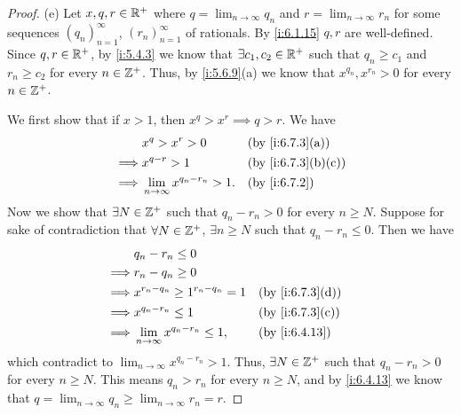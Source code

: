 \begin{proof}{(e)}
  Let \(x, q, r \in \mathbb{R}^+\) where \(q = \lim_{n \to \infty} q_n\) and \(r = \lim_{n \to \infty} r_n\) for some sequences \((q_n)_{n = 1}^\infty\), \((r_n)_{n = 1}^\infty\) of rationals.
  By \cref{i:6.1.15} \(q, r\) are well-defined.
  Since \(q, r \in \mathbb{R}^+\), by \cref{i:5.4.3} we know that \(\exists c_1, c_2 \in \mathbb{R}^+\) such that \(q_n \geq c_1\) and \(r_n \geq c_2\) for every \(n \in \mathbb{Z}^+\).
  Thus, by \cref{i:5.6.9}(a) we know that \(x^{q_n}, x^{r_n} > 0\) for every \(n \in \mathbb{Z}^+\).

  We first show that if \(x > 1\), then \(x^q > x^r \implies q > r\).
  We have
  \begin{align*}
             & x^q > x^r > 0                          &  & \by{i:6.7.3}[a]   \\
    \implies & x^{q - r} > 1                          &  & \by{i:6.7.3}[b,c] \\
    \implies & \lim_{n \to \infty} x^{q_n - r_n} > 1. &  & \by{i:6.7.2}      \\
  \end{align*}
  Now we show that \(\exists N \in \mathbb{Z}^+\) such that \(q_n - r_n > 0\) for every \(n \geq N\).
  Suppose for sake of contradiction that \(\forall N \in \mathbb{Z}^+\), \(\exists n \geq N\) such that \(q_n - r_n \leq 0\).
  Then we have
  \begin{align*}
             & q_n - r_n \leq 0                                               \\
    \implies & r_n - q_n \geq 0                                               \\
    \implies & x^{r_n - q_n} \geq 1^{r_n - q_n} = 1      &  & \by{i:6.7.3}[d] \\
    \implies & x^{q_n - r_n} \leq 1                      &  & \by{i:6.7.3}[c] \\
    \implies & \lim_{n \to \infty} x^{q_n - r_n} \leq 1, &  & \by{i:6.4.13}
  \end{align*}
  which contradict to \(\lim_{n \to \infty} x^{q_n - r_n} > 1\).
  Thus, \(\exists N \in \mathbb{Z}^+\) such that \(q_n - r_n > 0\) for every \(n \geq N\).
  This means \(q_n > r_n\) for every \(n \geq N\), and by \cref{i:6.4.13} we know that \(q = \lim_{n \to \infty} q_n \geq \lim_{n \to \infty} r_n = r\).


\end{proof}
